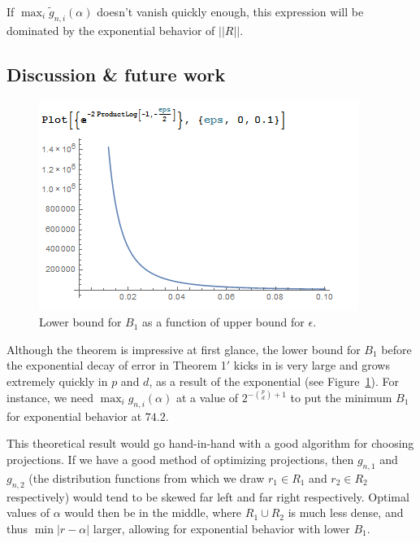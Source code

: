 \documentclass[ejs,preprint]{imsart}
\begin{document}
If $\max_i\tilde{g}_{n,i}(\alpha)$ doesn't vanish quickly enough, this
expression will be dominated by the exponential behavior of $||R||$.


\subsection{Discussion \& future work}

\begin{figure}
\begin{centering}
\includegraphics[scale=0.8]{aa-b1-as-func-of-eps.PNG}
\par\end{centering}

\caption{Lower bound for $B_{1}$ as a function of upper bound for $\epsilon$.}

\label{fig:b1-as-func-of-eps}
\end{figure}


Although the theorem is impressive at first glance, the lower bound
for $B_{1}$ before the exponential decay of error in Theorem 1$'$ kicks
in is very large and grows extremely quickly in $p$ and $d$, as
a result of the exponential (see Figure~\ref{fig:b1-as-func-of-eps}).
For instance, we need $\max_i g_{n,i}(\alpha)$
at a value of $2^{-\binom{p}{d}+1}$ to put the minimum $B_{1}$ for
exponential behavior at $74.2$.

This theoretical result would go hand-in-hand with a good algorithm
for choosing projections.
If we have a good method of optimizing projections, then $g_{n,1}$
and $g_{n,2}$ (the distribution functions from which we draw $r_{1}\in R_{1}$
and $r_{2}\in R_{2}$ respectively) would tend to be skewed far left
and far right respectively. Optimal values of $\alpha$ would then
be in the middle, where $R_{1}\cup R_{2}$ is much less dense, and
thus $\min|r-\alpha|$ larger, allowing for exponential behavior with
lower $B_{1}$.
\end{document}
